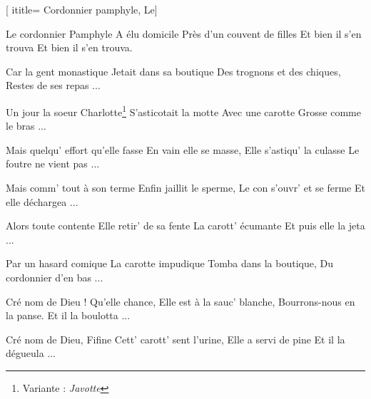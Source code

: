  [
ititle= {Cordonnier pamphyle, Le}]

\beginverse
Le cordonnier Pamphyle
A élu domicile
Près d'un couvent de filles
Et bien il s'en trouva
 {Et bien il s'en trouva.}
\endverse

\beginverse
Car la gent monastique
Jetait dans sa boutique
Des trognons et des chiques,
Restes de ses repas ...
\endverse

\beginverse
Un jour la soeur Charlotte\footnote {Variante : \emph{Javotte}}
S'asticotait la motte
Avec une carotte
Grosse comme le bras ...
\endverse

\beginverse
Mais quelqu' effort qu'elle fasse
En vain elle se masse,
Elle s'astiqu' la culasse
Le foutre ne vient pas ...
\endverse

\beginverse
Mais comm' tout à son terme
Enfin jaillit le sperme,
Le con s'ouvr' et se ferme
Et elle déchargea ...
\endverse

\beginverse
Alors toute contente
Elle retir' de sa fente
La carott' écumante
Et puis elle la jeta ...
\endverse

\beginverse
Par un hasard comique
La carotte impudique
Tomba dans la boutique,
Du cordonnier d'en bas ...
\endverse

\beginverse
Cré nom de Dieu ! Qu'elle chance,
Elle est à la sauc' blanche,
Bourrons-nous en la panse.
Et il la boulotta ...
\endverse

\beginverse
Cré nom de Dieu, Fifine
Cett' carott' sent l'urine,
Elle a servi de pine
Et il la dégueula ...
\endverse

\endsong